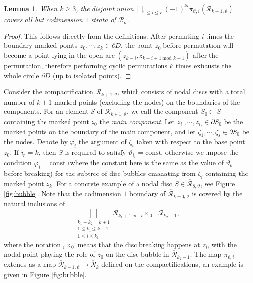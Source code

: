 \documentclass[a4paper]{article}
\newtheorem{lemma}[theorem]{Lemma}
\numberwithin{equation}{section}
\begin{document}
\begin{lemma}\label{lemma:erase}
When $k\geq3$, the disjoint union $\bigsqcup_{1\leq i\leq k}(-1)^{ki}\pi_{\vartheta,i}(\mathcal{R}_{k+1,\vartheta})$ covers all but codimension $1$ strata of $\mathcal{R}_k$.
\end{lemma}
\begin{proof}
This follows directly from the definitions. After permuting $i$ times the boundary marked points $z_0,\cdots,z_k\in\partial D$, the point $z_0$ before permutation will become a point lying in the open arc $(z_{k-i},z_{k-i+1\textrm{ mod }k+1})$ after the permutation, therefore performing cyclic permutations $k$ times exhausts the whole circle $\partial D$ (up to isolated points).
\end{proof}

Consider the compactification $\overline{\mathcal{R}}_{k+1,\vartheta}$, which consists of nodal discs with a total number of $k+1$ marked points (excluding the nodes) on the boundaries of the components. For an element $S$ of $\overline{\mathcal{R}}_{k+1,\vartheta}$, we call the component $S_0\subset S$ containing the marked point $z_0$ the \textit{main component}. Let $z_{i_1},\cdots,z_{i_r}\in\partial S_0$ be the marked points on the boundary of the main component, and let $\zeta_1,\cdots,\zeta_s\in\partial S_0$ be the nodes. Denote by $\varphi_i$ the argument of $\zeta_i$ taken with respect to the base point $z_0$. If $i_r=k$, then $S$ is required to satisfy $\vartheta_{i_r}=\mathrm{const}$, otherwise we impose the condition $\varphi_i=\mathrm{const}$ (where the constant here is the same as the value of $\vartheta_k$ before breaking) for the subtree of disc bubbles emanating from $\zeta_i$ containing the marked point $z_k$. For a concrete example of a nodal disc $S\in\overline{\mathcal{R}}_{8,\vartheta}$, see Figure \ref{fig:bubble}. Note that the codimension $1$ boundary of $\overline{\mathcal{R}}_{k+1,\vartheta}$ is covered by the natural inclusions of
\begin{equation}\label{eq:st}
\bigsqcup_{\substack{k_1+k_2=k+1\\1\leq k_1\leq k-1\\1\leq i\leq k_1}}\overline{\mathcal{R}}_{k_1+1,\vartheta}\textrm{ }{{}_i\times_0}\textrm{ }\overline{\mathcal{R}}_{k_2+1},
\end{equation}
where the notation ${{}_i\times_0}$ means that the disc breaking happens at $z_i$, with the nodal point playing the role of $z_0$ on the disc bubble in $\overline{\mathcal{R}}_{k_2+1}$. The map $\pi_{\vartheta,i}$ extends as a map $\overline{\mathcal{R}}_{k+1,\vartheta}\rightarrow\overline{\mathcal{R}}_k$ defined on the compactifications, an example is given in Figure \ref{fig:bubble}.
\end{document}
